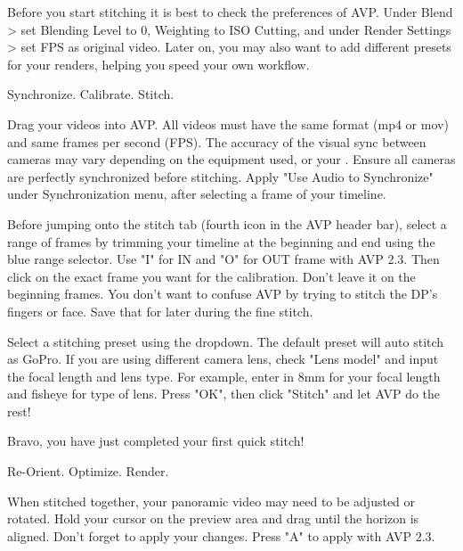 \begin{fullwidth}
\tip Before you start stitching it is best to check the preferences of AVP. Under Blend > set Blending Level to 0, Weighting to ISO Cutting, and under Render Settings > set FPS as original video. Later on, you may also want to add different presets for your renders, helping you speed your own workflow.


{\large Synchronize. Calibrate. Stitch. \par}

Drag your videos into AVP. All videos must have the same format (mp4 or mov) and same frames per second (FPS). The accuracy of the visual sync between cameras may vary depending on the equipment used, or your \textbf{}. Ensure all cameras are perfectly synchronized before stitching. Apply "Use Audio to Synchronize" under Synchronization menu, after selecting a frame of your timeline. 


Before jumping onto the stitch tab (fourth icon in the AVP header bar), select a range of frames by trimming your timeline at the beginning and end using the blue range selector. Use "I" for IN and "O" for OUT frame with AVP 2.3. Then click on the exact frame you want for the calibration. Don't leave it on the beginning frames. You don't want to confuse AVP by trying to stitch the DP's fingers or face. Save that for later during the fine stitch. 


Select a stitching preset using the dropdown. The default preset will auto stitch as GoPro. If you are using different camera lens, check "Lens model" and input the focal length and lens type. For example, enter in 8mm for your focal length and fisheye for type of lens. Press "OK", then click "Stitch" and let AVP do the rest!


Bravo, you have just completed your first quick stitch!

{\large Re-Orient. Optimize. Render. \par}

When stitched together, your panoramic video may need to be adjusted or rotated. Hold your cursor on the preview area and drag until the horizon is aligned. Don't forget to apply your changes. Press "A" to apply with AVP 2.3.



\end{fullwidth}
